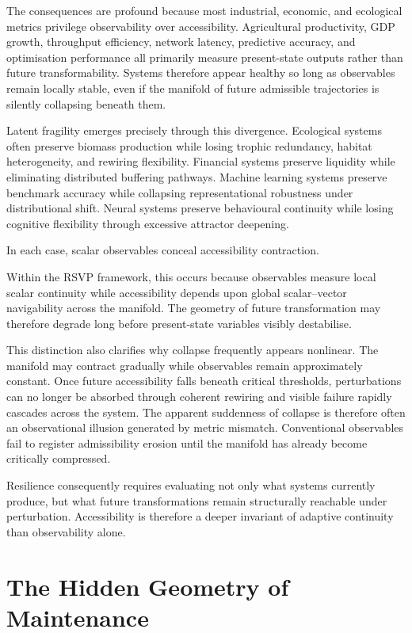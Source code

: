 \documentclass[11pt,a4paper]{article}
\begin{document}
The consequences are profound because most industrial, economic, and ecological metrics privilege observability over accessibility. Agricultural productivity, GDP growth, throughput efficiency, network latency, predictive accuracy, and optimisation performance all primarily measure present-state outputs rather than future transformability. Systems therefore appear healthy so long as observables remain locally stable, even if the manifold of future admissible trajectories is silently collapsing beneath them.

Latent fragility emerges precisely through this divergence. Ecological systems often preserve biomass production while losing trophic redundancy, habitat heterogeneity, and rewiring flexibility. Financial systems preserve liquidity while eliminating distributed buffering pathways. Machine learning systems preserve benchmark accuracy while collapsing representational robustness under distributional shift. Neural systems preserve behavioural continuity while losing cognitive flexibility through excessive attractor deepening.

In each case, scalar observables conceal accessibility contraction.

Within the RSVP framework, this occurs because observables measure local scalar continuity while accessibility depends upon global scalar--vector navigability across the manifold. The geometry of future transformation may therefore degrade long before present-state variables visibly destabilise.

This distinction also clarifies why collapse frequently appears nonlinear. The manifold may contract gradually while observables remain approximately constant. Once future accessibility falls beneath critical thresholds, perturbations can no longer be absorbed through coherent rewiring and visible failure rapidly cascades across the system. The apparent suddenness of collapse is therefore often an observational illusion generated by metric mismatch. Conventional observables fail to register admissibility erosion until the manifold has already become critically compressed.

Resilience consequently requires evaluating not only what systems currently produce, but what future transformations remain structurally reachable under perturbation. Accessibility is therefore a deeper invariant of adaptive continuity than observability alone.


\newpage

\section{The Hidden Geometry of Maintenance}
\end{document}
